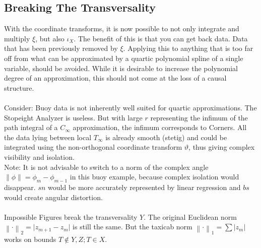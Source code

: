\documentclass{report}
\newcommand\norm[1]{\left\lVert#1\right\rVert}
\begin{document}
\subsection{Breaking The Transversality}
With the coordinate transforms, it is now possible to not only integrate and multiply $\xi$, but also $\iota_{X}$. The benefit of this is that you can get back data. Data that has been previously removed by $\xi$. Applying this to anything that is too far off from what can be approximated by a quartic polynomial spline of a single variable, should be avoided. While it is desirable to increase the polynomial degree of an approximation, this should not come at the loss of a causal structure.\\\\
Consider: Buoy data is not inherently well suited for quartic approximations. The Stopeight Analyzer is useless. But with large $r$ representing the infimum of the path integral of a $C_{\infty}$ approximation, the infimum corresponds to Corners. All the data lying between local $T_{\infty}$ is already smooth (stetig) and could be integrated using the non-orthogonal coordinate transform $\vartheta$, thus giving complex visibility and isolation.\\
Note: It is not advisable to switch to a norm of the complex angle $\norm{\phi} = \phi_{m}-\phi_{m-1}$ in this buoy example, because complex isolation would disappear. $sn$ would be more accurately represented by linear regression and $bs$ would create angular distortion.\\\\
Impossible Figures break the transversality $Y$. The original Euclidean norm $\norm{\cdot}_2 = \lvert z_{m+1}-z_{m} \rvert$ is still the same. But the taxicab norm $\norm{\cdot}_1 = \sum \lvert z_{m} \rvert$ works on bounds $T \not \in Y,Z; T \in X$.
\end{document}
